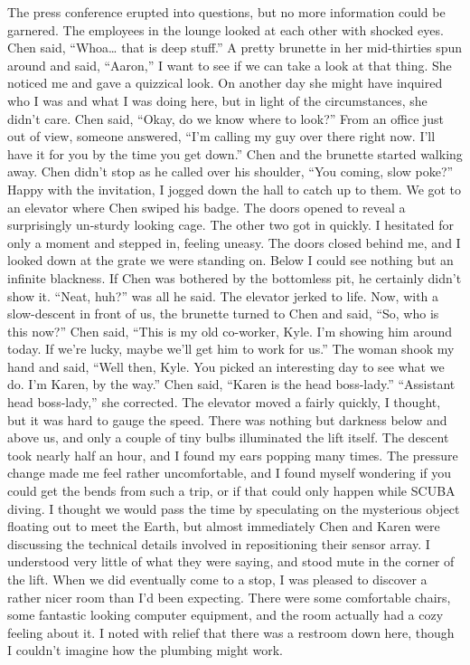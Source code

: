 \documentclass[a4paper]{article}
\begin{document}
The press conference erupted into questions, but no more information could be garnered. The employees in the lounge looked at each other with shocked eyes. Chen said, “Whoa… that is deep stuff.”
A pretty brunette in her mid-thirties spun around and said, “Aaron,” I want to see if we can take a look at that thing. She noticed me and gave a quizzical look. On another day she might have inquired who I was and what I was doing here, but in light of the circumstances, she didn’t care.
Chen said, “Okay, do we know where to look?”
From an office just out of view, someone answered, “I’m calling my guy over there right now. I’ll have it for you by the time you get down.”
Chen and the brunette started walking away. Chen didn’t stop as he called over his shoulder, “You coming, slow poke?”
Happy with the invitation, I jogged down the hall to catch up to them. We got to an elevator where Chen swiped his badge. The doors opened to reveal a surprisingly un-sturdy looking cage. The other two got in quickly. I hesitated for only a moment and stepped in, feeling uneasy.
The doors closed behind me, and I looked down at the grate we were standing on. Below I could see nothing but an infinite blackness. If Chen was bothered by the bottomless pit, he certainly didn’t show it. “Neat, huh?” was all he said.
The elevator jerked to life. Now, with a slow-descent in front of us, the brunette turned to Chen and said, “So, who is this now?”
Chen said, “This is my old co-worker, Kyle. I’m showing him around today. If we’re lucky, maybe we’ll get him to work for us.”
The woman shook my hand and said, “Well then, Kyle. You picked an interesting day to see what we do. I’m Karen, by the way.”
Chen said, “Karen is the head boss-lady.”
“Assistant head boss-lady,” she corrected.
The elevator moved a fairly quickly, I thought, but it was hard to gauge the speed. There was nothing but darkness below and above us, and only a couple of tiny bulbs illuminated the lift itself.
The descent took nearly half an hour, and I found my ears popping many times. The pressure change made me feel rather uncomfortable, and I found myself wondering if you could get the bends from such a trip, or if that could only happen while SCUBA diving.
I thought we would pass the time by speculating on the mysterious object floating out to meet the Earth, but almost immediately Chen and Karen were discussing the technical details involved in repositioning their sensor array. I understood very little of what they were saying, and stood mute in the corner of the lift.
When we did eventually come to a stop, I was pleased to discover a rather nicer room than I’d been expecting. There were some comfortable chairs, some fantastic looking computer equipment, and the room actually had a cozy feeling about it. I noted with relief that there was a restroom down here, though I couldn’t imagine how the plumbing might work.
\end{document}
